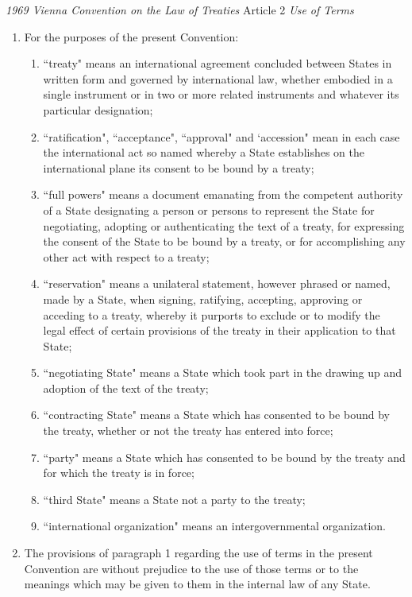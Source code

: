 \begin{conventiondetails}{\textit{1969 Vienna Convention on the Law of Treaties} Article 2}\label{VCLT Art 2}
    \flushleft
    \textit{Use of Terms}

    \begin{enumerate}
        \item For the purposes of the present Convention:
        \begin{enumerate}[label=(\alph*)]
            \item ``treaty" means an international agreement concluded between States in written form and governed by international law, whether embodied in a single instrument or in two or more related instruments and whatever its particular designation; 
            \item ``ratification", ``acceptance", ``approval" and `accession" mean in each case the international act so named whereby a State establishes on the international plane its consent to be bound by a treaty; 
            \item ``full powers" means a document emanating from the competent authority of a State designating a person or persons to represent the State for negotiating, adopting or authenticating the text of a treaty, for expressing the consent of the State to be bound by a treaty, or for accomplishing any other act with respect to a treaty; 
            \item ``reservation" means a unilateral statement, however phrased or named, made by a State, when signing, ratifying, accepting, approving or acceding to a treaty, whereby it purports to exclude or to modify the legal effect of certain provisions of the treaty in their application to that State; 
            \item ``negotiating State" means a State which took part in the drawing up and adoption of the text of the treaty; 
            \item ``contracting State" means a State which has consented to be bound by the treaty, whether or not the treaty has entered into force; 
            \item ``party" means a State which has consented to be bound by the treaty and for which the treaty is in force; 
            \item ``third State" means a State not a party to the treaty; 
            \item ``international organization" means an intergovernmental organization. 
        \end{enumerate}
        \item  The provisions of paragraph 1 regarding the use of terms in the present Convention are without 
        prejudice to the use of those terms or to the meanings which may be given to them in the internal law of 
        any State. 
    \end{enumerate}
\end{conventiondetails}

